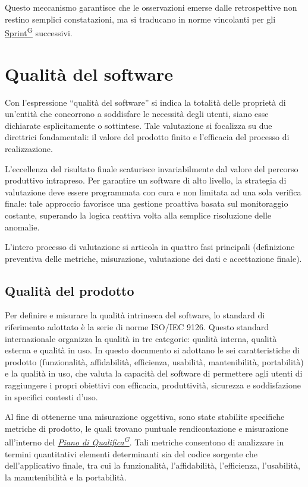 \documentclass[a4paper,12pt]{article}
\providecommand{\glslink}[2]{\href{https://alittlebyte-19.github.io/Documentazione/glossario.html\#gls-#1}{\underline{#2}\textsuperscript{\scriptsize G}}}
\begin{document}
Questo meccanismo garantisce che le osservazioni emerse dalle retrospettive non restino semplici constatazioni, ma si traducano in norme vincolanti per gli \glslink{sprint}{Sprint} successivi.


\section{Qualità del software}
Con l'espressione ``qualità del software'' si indica la totalità delle proprietà di un'entità che concorrono a soddisfare le necessità degli utenti, siano esse dichiarate esplicitamente o sottintese. Tale valutazione si focalizza su due direttrici fondamentali: il valore del prodotto finito e l'efficacia del processo di realizzazione.

L'eccellenza del risultato finale scaturisce invariabilmente dal valore del percorso produttivo intrapreso. Per garantire un software di alto livello, la strategia di valutazione deve essere programmata con cura e non limitata ad una sola verifica finale: tale approccio favorisce una gestione proattiva basata sul monitoraggio costante, superando la logica reattiva volta alla semplice risoluzione delle anomalie.

L'intero processo di valutazione si articola in quattro fasi principali (definizione preventiva delle metriche, misurazione, valutazione dei dati e accettazione finale).

\subsection{Qualità del prodotto}
Per definire e misurare la qualità intrinseca del software, lo standard di riferimento adottato è la serie di norme ISO/IEC 9126. Questo standard internazionale organizza la qualità in tre categorie: qualità interna, qualità esterna e qualità in uso. In questo documento si adottano le sei caratteristiche di prodotto (funzionalità, affidabilità, efficienza, usabilità, mantenibilità, portabilità) e la qualità in uso, che valuta la capacità del software di permettere agli utenti di raggiungere i propri obiettivi con efficacia, produttività, sicurezza e soddisfazione in specifici contesti d'uso.

Al fine di ottenerne una misurazione oggettiva, sono state stabilite specifiche metriche di prodotto, le quali trovano puntuale rendicontazione e misurazione all'interno del \textit{\glslink{piano-di-qualifica}{Piano di Qualifica}}. Tali metriche consentono di analizzare in termini quantitativi elementi determinanti sia del codice sorgente che dell'applicativo finale, tra cui la funzionalità, l'affidabilità, l'efficienza, l'usabilità, la manutenibilità e la portabilità.
\end{document}

